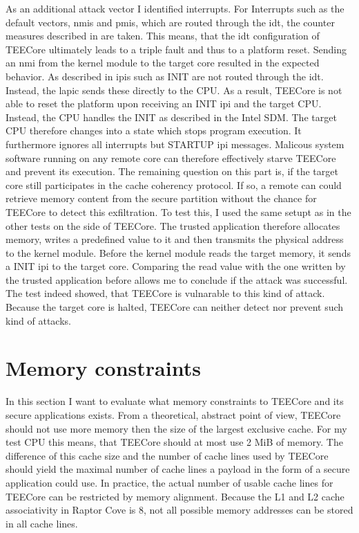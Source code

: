 As an additional attack vector I identified interrupts. For Interrupts such as
the default vectors, \glspl{nmi} and \glspl{pmi}, which are routed through the
\gls{idt}, the counter measures described in are taken. This means, that the \gls{idt}
configuration of TEECore ultimately leads to a triple fault and thus to a
platform reset. Sending an \gls{nmi} from the kernel module to the target core
resulted in the expected behavior. As described in  \glspl{ipi}
such as INIT are not routed through the \gls{idt}. Instead, the \gls{lapic}
sends these directly to the CPU. As a result, TEECore is not able to reset the
platform upon receiving an INIT \gls{ipi} and the target CPU. Instead, the CPU
handles the INIT as described in the Intel SDM. The target CPU therefore changes
into a state which stops program execution. It furthermore ignores all
interrupts but STARTUP \gls{ipi} messages. Malicous system software running on
any remote core can therefore effectively starve TEECore and prevent its
execution. The remaining question on this part is, if the target core still
participates in the cache coherency protocol. If so, a remote can could retrieve
memory content from the secure partition without the chance for TEECore to
detect this exfiltration. To test this, I used the same setupt as in the other
tests on the side of TEECore. The trusted application therefore allocates
memory, writes a predefined value to it and then transmits the physical address
to the kernel module. Before the kernel module reads the target memory, it sends
a INIT \gls{ipi} to the target core. Comparing the read value with the one
written by the trusted application before allows me to conclude if the attack
was successful. The test indeed showed, that TEECore is vulnarable to this kind
of attack. Because the target core is halted, TEECore can neither detect nor
prevent such kind of attacks.

\section{Memory constraints}
In this section I want to evaluate what memory constraints to TEECore and its
secure applications exists. From a theoretical, abstract point of view, TEECore
should not use more memory then the size of the largest exclusive cache. For my
test CPU this means, that TEECore should at most use 2 MiB of memory. The
difference of this cache size and the number of cache lines used by TEECore
should yield the maximal number of cache lines a payload in the form of a secure
application could use. In practice, the actual number of usable cache lines for
TEECore can be restricted by memory alignment. Because the L1 and L2 cache
associativity in Raptor Cove is 8, not all possible memory addresses can be
stored in all cache lines.\\

